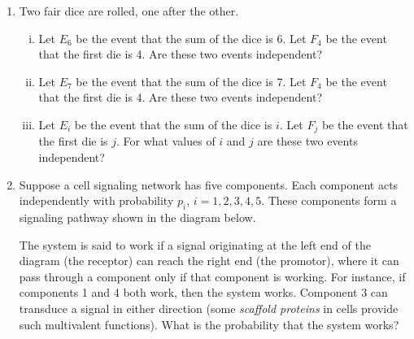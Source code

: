 \documentclass[12pt,letterpaper]{article}
\begin{document}
\begin{enumerate}

\item Two fair dice are rolled, one after the other. 
\begin{enumerate}[i.]
\item Let $E_{6}$ be the event that the sum of the dice is 6. Let $F_4$ be the event that the first die is 4. Are these two events independent?
\item Let $E_{7}$ be the event that the sum of the dice is 7. Let $F_4$ be the event that the first die is 4. Are these two events independent?
\item Let $E_i$ be the event that the sum of the dice is $i$. Let $F_j$ be the event that the first die is $j$. For what values of $i$ and $j$ are these two events independent?
\end{enumerate}

\item Suppose a cell signaling network has five components. Each component acts independently with probability $p_i$, $i=1,2,3,4,5$. These components form a signaling pathway shown in the diagram below. 
\begin{figure}[h!]
\end{figure}
The system is said to work if a signal originating at the left end of the diagram (the receptor) can reach the right end (the promotor), where it can pass through a component only if that component is working. For instance, if components 1 and 4 both work, then the system works. Component 3 can transduce a signal in either direction (some \emph{scaffold proteins} in cells provide such multivalent functions). What is the probability that the system works? 

\end{enumerate}
\end{document}

